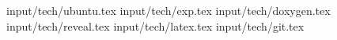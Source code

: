 
\newpage
 {input/tech/ubuntu.tex}
\newpage
 {input/tech/exp.tex}
\newpage
 {input/tech/doxygen.tex}
\newpage
 {input/tech/reveal.tex}
\newpage
 {input/tech/latex.tex}
\newpage
 {input/tech/git.tex}
\newpage





